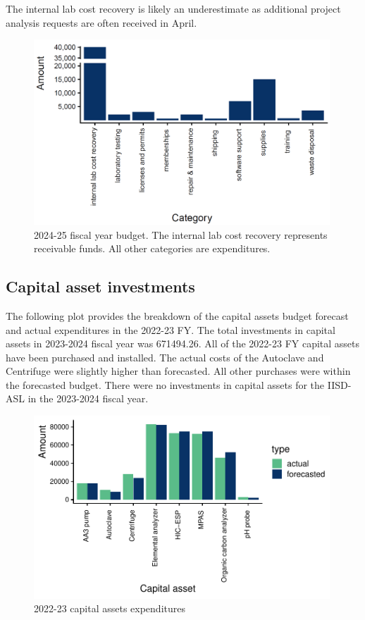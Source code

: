 \documentclass[
]{article}
\begin{document}
The internal lab cost recovery is likely an underestimate as additional
project analysis requests are often received in April.

\begin{figure}[h]
\centering
  \includegraphics[width=0.99\textwidth]{FY2024_25_budget_snip.png}
  \caption{2024-25 fiscal year budget. The internal lab cost recovery represents receivable funds. All other categories are expenditures.}
\end{figure}
\pagebreak

\hypertarget{capital-asset-investments}{%
\subsection{Capital asset investments}\label{capital-asset-investments}}

The following plot provides the breakdown of the capital assets budget
forecast and actual expenditures in the 2022-23 FY. The total
investments in capital assets in 2023-2024 fiscal year was 671494.26.
All of the 2022-23 FY capital assets have been purchased and installed.
The actual costs of the Autoclave and Centrifuge were slightly higher
than forecasted. All other purchases were within the forecasted budget.
There were no investments in capital assets for the IISD-ASL in the
2023-2024 fiscal year.

\begin{figure}[h]
\centering
  \includegraphics[width=0.99\textwidth]{2022_23FY_capital_assets.pdf}
  \caption{2022-23 capital assets expenditures}
\end{figure}
\end{document}
